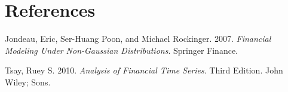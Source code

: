 \documentclass[11pt,]{article}
\begin{document}
\section*{References}\label{references}

\hypertarget{refs}{}
\hypertarget{ref-Jondeau_Poon_Rockinger:2007}{}
Jondeau, Eric, Ser-Huang Poon, and Michael Rockinger. 2007.
\emph{Financial Modeling Under Non-Gaussian Distributions}. Springer
Finance.

\hypertarget{ref-Tsay:2010}{}
Tsay, Ruey S. 2010. \emph{Analysis of Financial Time Series}. Third
Edition. John Wiley; Sons.
\end{document}
